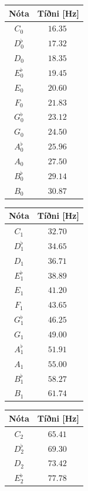\begin{table}[H]
\begin{center}
\begin{tabular}{|c|c|}
\hline
\textbf{Nóta} & \textbf{Tíðni [Hz]} \\
\hline
\hline
$C_0$ & $\SI{16.35}{}$ \\
$D^\flat_0$ & $\SI{17.32}{}$ \\
$D_0$ & $\SI{18,35}{}$ \\
$E^\flat_0$ & $\SI{19,45}{}$ \\
$E_0$ & $\SI{20.60}{}$ \\
$F_0$ & $\SI{21,83}{}$ \\
$G^\flat_0$ & $\SI{23,12}{}$ \\
$G_0$ & $\SI{24,50}{}$ \\
$A^\flat_0$ & $\SI{25,96}{}$ \\
$A_0$ & $\SI{27,50}{}$ \\
$B^\flat_0$ & $\SI{29,14}{}$ \\
$B_0$ & $\SI{30,87}{}$ \\
\hline
\end{tabular}
\quad
\begin{tabular}{|c|c|}
\hline
\textbf{Nóta} & \textbf{Tíðni [Hz]} \\
\hline
\hline
$C_1$ & $\SI{32.70}{}$ \\
$D^\flat_1$ & $\SI{34.65}{}$ \\
$D_1$ & $\SI{36.71}{}$ \\
$E^\flat_1$ & $\SI{38.89}{}$ \\
$E_1$ & $\SI{41.20}{}$ \\
$F_1$ & $\SI{43.65}{}$ \\
$G^\flat_1$ & $\SI{46.25}{}$ \\
$G_1$ & $\SI{49.00}{}$ \\
$A^\flat_1$ & $\SI{51.91}{}$ \\
$A_1$ & $\SI{55.00}{}$ \\
$B^\flat_1$ & $\SI{58.27}{}$ \\
$B_1$ & $\SI{61.74}{}$ \\
\hline
\end{tabular}
\quad
\begin{tabular}{|c|c|}
\hline
\textbf{Nóta} & \textbf{Tíðni [Hz]} \\
\hline
\hline
$C_2$ & $\SI{65.41}{}$ \\
$D^\flat_2$ & $\SI{69.30}{}$ \\
$D_2$ & $\SI{73.42}{}$ \\
$E^\flat_2$ & $\SI{77.78}{}$ \\

\end{tabular}
\end{center}
\end{table}
